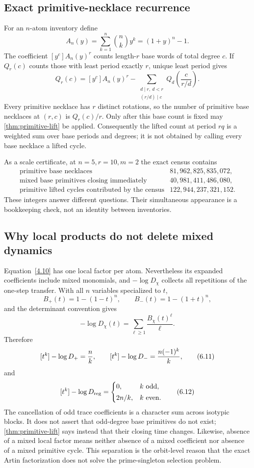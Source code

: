 \subsection{Exact primitive-necklace recurrence}

For an \(n\)-atom inventory define
\[
A_n(y)=\sum_{k=1}^{n}\binom nk y^k=(1+y)^n-1.
\tag{6.6}\label{6.6}
\]
The coefficient \([y^c]A_n(y)^r\) counts length-\(r\) base words of total
degree \(c\).  If \(Q_r(c)\) counts those with least period exactly \(r\),
unique least period gives
\[
Q_r(c)=[y^c]A_n(y)^r-
\sum_{\substack{d\mid r,\ d<r\\(r/d)\mid c}}
Q_d\!\left(\frac{c}{r/d}\right).
\tag{6.7}\label{6.7}
\]
Every primitive necklace has \(r\) distinct rotations, so the number of
primitive base necklaces at \((r,c)\) is \(Q_r(c)/r\).  Only after this base
count is fixed may \cref{thm:primitive-lift} be applied.  Consequently the
lifted count at period \(rq\) is a weighted sum over base periods and degrees;
it is not obtained by calling every base necklace a lifted cycle.

As a scale certificate, at \(n=5,r=10,m=2\) the exact census contains
\[
\begin{array}{lr}
\text{primitive base necklaces}&81{,}962{,}825{,}835{,}072,\\
\text{mixed base primitives closing immediately}&40{,}981{,}411{,}486{,}080,\\
\text{primitive lifted cycles contributed by the census}&
122{,}944{,}237{,}321{,}152.
\end{array}
\tag{6.8}\label{6.8}
\]
These integers answer different questions.  Their simultaneous appearance is
a bookkeeping check, not an identity between inventories.

\subsection{Why local products do not delete mixed dynamics}

Equation~\eqref{4.10} has one local factor per atom.  Nevertheless its
expanded coefficients include mixed monomials, and
\(-\log D_\chi\) collects all repetitions of the one-step transfer.  With
all \(n\) variables specialized to \(t\),
\[
B_+(t)=1-(1-t)^n,\qquad
B_-(t)=1-(1+t)^n,
\tag{6.9}\label{6.9}
\]
and the determinant convention gives
\[
-\log D_\chi(t)=\sum_{\ell\ge1}\frac{B_\chi(t)^\ell}{\ell}.
\tag{6.10}\label{6.10}
\]
Therefore
\[
[t^k]-\log D_+=\frac nk,\qquad
[t^k]-\log D_-=\frac{n(-1)^k}{k},
\tag{6.11}\label{6.11}
\]
and
\[
[t^k]-\log D_{\mathrm{reg}}=
\begin{cases}
0,&k\ \text{odd},\\[2pt]
2n/k,&k\ \text{even}.
\end{cases}
\tag{6.12}\label{6.12}
\]
The cancellation of odd trace coefficients is a character sum across
isotypic blocks.  It does not assert that odd-degree base primitives do not
exist; \cref{thm:primitive-lift} says instead that their closing time changes.
Likewise, absence of a mixed local factor means neither absence of a mixed
coefficient nor absence of a mixed primitive cycle.  This separation is the
orbit-level reason that the exact Artin factorization does not solve the
prime-singleton selection problem.
